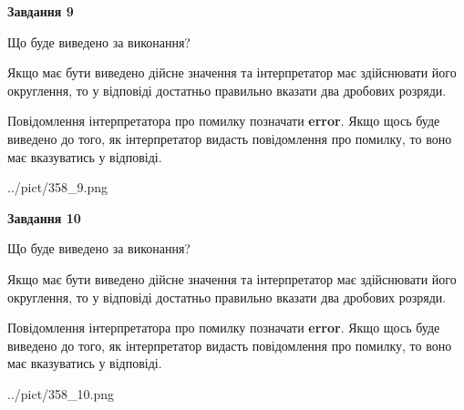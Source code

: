 \documentclass[12pt, ukrainian]{article}
\begin{document}
{\begin {Large}
{\begin {center}\textbf{Завдання 9}\end {center}}\par
Що буде виведено за виконання? \par

Якщо має бути виведено дійсне значення та інтерпретатор має здійснювати його округлення, 
то у відповіді достатньо правильно вказати два дробових розряди.

Повідомлення інтерпретатора про помилку позначати \textbf{error}.
Якщо щось буде виведено до того, як інтерпретатор видасть повідомлення про помилку, 
то воно має вказуватись у відповіді. \par

\begin{center}
	{../pict/358_9.png}
\end{center}
\newpage

{\begin {center}\textbf{Завдання 10}\end {center}}\par
Що буде виведено за виконання? \par

Якщо має бути виведено дійсне значення та інтерпретатор має здійснювати його округлення, 
то у відповіді достатньо правильно вказати два дробових розряди.

Повідомлення інтерпретатора про помилку позначати \textbf{error}.
Якщо щось буде виведено до того, як інтерпретатор видасть повідомлення про помилку, 
то воно має вказуватись у відповіді. \par

\begin{center}
	{../pict/358_10.png}
\end{center}
\newpage

\end {Large}}
\end{document}

